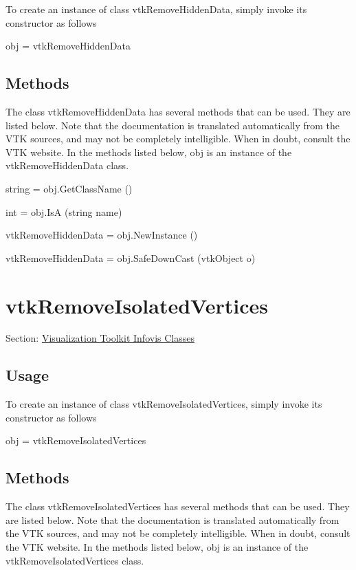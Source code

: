 To create an instance of class vtk\-Remove\-Hidden\-Data, simply invoke its constructor as follows \begin{DoxyVerb}  obj = vtkRemoveHiddenData
\end{DoxyVerb}
 \hypertarget{vtkwidgets_vtkxyplotwidget_Methods}{}\subsection{Methods}\label{vtkwidgets_vtkxyplotwidget_Methods}
The class vtk\-Remove\-Hidden\-Data has several methods that can be used. They are listed below. Note that the documentation is translated automatically from the V\-T\-K sources, and may not be completely intelligible. When in doubt, consult the V\-T\-K website. In the methods listed below, {\ttfamily obj} is an instance of the vtk\-Remove\-Hidden\-Data class. 
\begin{DoxyItemize}
\item {\ttfamily string = obj.\-Get\-Class\-Name ()}  
\item {\ttfamily int = obj.\-Is\-A (string name)}  
\item {\ttfamily vtk\-Remove\-Hidden\-Data = obj.\-New\-Instance ()}  
\item {\ttfamily vtk\-Remove\-Hidden\-Data = obj.\-Safe\-Down\-Cast (vtk\-Object o)}  
\end{DoxyItemize}\hypertarget{vtkinfovis_vtkremoveisolatedvertices}{}\section{vtk\-Remove\-Isolated\-Vertices}\label{vtkinfovis_vtkremoveisolatedvertices}
Section\-: \hyperlink{sec_vtkinfovis}{Visualization Toolkit Infovis Classes} \hypertarget{vtkwidgets_vtkxyplotwidget_Usage}{}\subsection{Usage}\label{vtkwidgets_vtkxyplotwidget_Usage}
To create an instance of class vtk\-Remove\-Isolated\-Vertices, simply invoke its constructor as follows \begin{DoxyVerb}  obj = vtkRemoveIsolatedVertices
\end{DoxyVerb}
 \hypertarget{vtkwidgets_vtkxyplotwidget_Methods}{}\subsection{Methods}\label{vtkwidgets_vtkxyplotwidget_Methods}
The class vtk\-Remove\-Isolated\-Vertices has several methods that can be used. They are listed below. Note that the documentation is translated automatically from the V\-T\-K sources, and may not be completely intelligible. When in doubt, consult the V\-T\-K website. In the methods listed below, {\ttfamily obj} is an instance of the vtk\-Remove\-Isolated\-Vertices class. 

